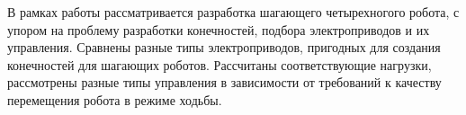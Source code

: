
В рамках работы рассматривается разработка шагающего четырехногого робота, с упором на проблему разработки конечностей, подбора электроприводов и их управления. Сравнены разные типы электроприводов, пригодных для создания конечностей для шагающих роботов. Рассчитаны соответствующие нагрузки, рассмотрены разные типы управления в зависимости от требований к качеству перемещения робота в режиме ходьбы. 



